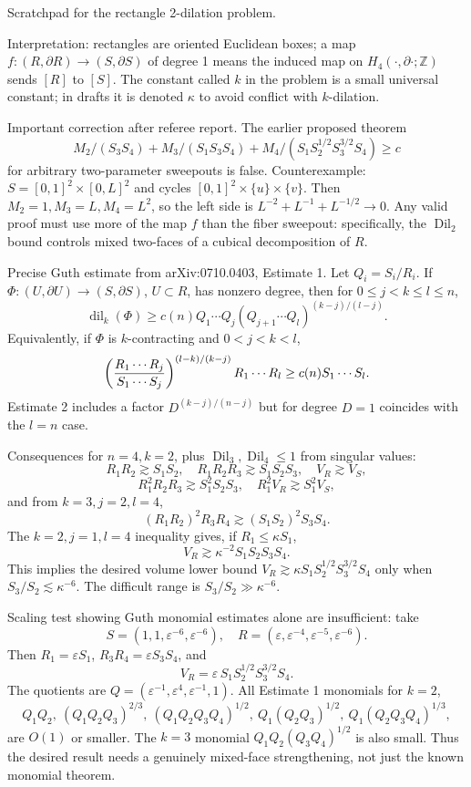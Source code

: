 \documentclass[12pt]{article}
\newcommand{\Dil}{\operatorname{Dil}}
\begin{document}
Scratchpad for the rectangle 2-dilation problem.

Interpretation: rectangles are oriented Euclidean boxes; a map
\(f:(R,\partial R)\to(S,\partial S)\) of degree 1 means the induced map on
\(H_4(\cdot,\partial\cdot;\mathbb Z)\) sends \([R]\) to \([S]\).
The constant called \(k\) in the problem is a small universal constant;
in drafts it is denoted \(\kappa\) to avoid conflict with \(k\)-dilation.

Important correction after referee report.  The earlier proposed theorem
\[
 M_2/(S_3S_4)+M_3/(S_1S_3S_4)
 +M_4/(S_1S_2^{1/2}S_3^{3/2}S_4)\ge c
\]
for arbitrary two-parameter sweepouts is false.  Counterexample:
\(S=[0,1]^2\times[0,L]^2\) and cycles
\([0,1]^2\times\{u\}\times\{v\}\).  Then \(M_2=1,M_3=L,M_4=L^2\), so the
left side is \(L^{-2}+L^{-1}+L^{-1/2}\to0\).  Any valid proof must use
more of the map \(f\) than the fiber sweepout: specifically, the
\(\Dil_2\) bound controls mixed two-faces of a cubical decomposition of
\(R\).

Precise Guth estimate from arXiv:0710.0403, Estimate 1.  Let
\(Q_i=S_i/R_i\).  If \(\Phi:(U,\partial U)\to(S,\partial S)\), \(U\subset R\),
has nonzero degree, then for \(0\le j<k\le l\le n\),
\[
 \operatorname{dil}_k(\Phi)\ge c(n)Q_1\cdots Q_j
   (Q_{j+1}\cdots Q_l)^{(k-j)/(l-j)}.
\]
Equivalently, if \(\Phi\) is \(k\)-contracting and \(0<j<k<l\),
\[
 \left({R_1\cdots R_j\over S_1\cdots S_j}\right)^{(l-k)/(k-j)}
 R_1\cdots R_l \ge c(n)S_1\cdots S_l .
\]
Estimate 2 includes a factor \(D^{(k-j)/(n-j)}\) but for degree \(D=1\)
coincides with the \(l=n\) case.

Consequences for \(n=4,k=2\), plus \(\Dil_3,\Dil_4\le1\) from singular
values:
\[
R_1R_2\gtrsim S_1S_2,\quad R_1R_2R_3\gtrsim S_1S_2S_3,\quad
V_R\gtrsim V_S,
\]
\[
R_1^2R_2R_3\gtrsim S_1^2S_2S_3,\quad
R_1^2V_R\gtrsim S_1^2V_S,
\]
and from \(k=3,j=2,l=4\),
\[
(R_1R_2)^2R_3R_4\gtrsim (S_1S_2)^2S_3S_4.
\]
The \(k=2,j=1,l=4\) inequality gives, if \(R_1\le\kappa S_1\),
\[
V_R\gtrsim \kappa^{-2}S_1S_2S_3S_4.
\]
This implies the desired volume lower bound
\(V_R\gtrsim \kappa S_1S_2^{1/2}S_3^{3/2}S_4\) only when
\(S_3/S_2\lesssim \kappa^{-6}\).  The difficult range is
\(S_3/S_2\gg \kappa^{-6}\).

Scaling test showing Guth monomial estimates alone are insufficient:
take
\[
S=(1,1,\varepsilon^{-6},\varepsilon^{-6}),\quad
R=(\varepsilon,\varepsilon^{-4},\varepsilon^{-5},\varepsilon^{-6}).
\]
Then \(R_1=\varepsilon S_1\), \(R_3R_4=\varepsilon S_3S_4\), and
\[
V_R=\varepsilon\, S_1S_2^{1/2}S_3^{3/2}S_4.
\]
The quotients are \(Q=(\varepsilon^{-1},\varepsilon^4,\varepsilon^{-1},1)\).
All Estimate 1 monomials for \(k=2\),
\[
Q_1Q_2,\ (Q_1Q_2Q_3)^{2/3},\ (Q_1Q_2Q_3Q_4)^{1/2},\
Q_1(Q_2Q_3)^{1/2},\ Q_1(Q_2Q_3Q_4)^{1/3},
\]
are \(O(1)\) or smaller.  The \(k=3\) monomial
\(Q_1Q_2(Q_3Q_4)^{1/2}\) is also small.  Thus the desired result needs a
genuinely mixed-face strengthening, not just the known monomial theorem.
\end{document}
